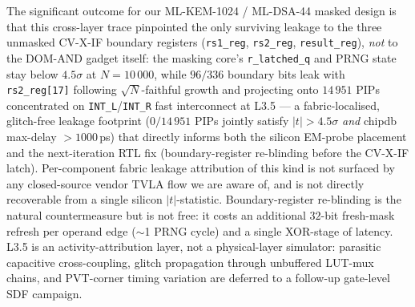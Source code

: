 \documentclass[10pt,a4paper]{article}
\begin{document}
The significant outcome for our ML-KEM-1024 / ML-DSA-44 masked design is
that this cross-layer trace pinpointed the only surviving leakage to the
three unmasked CV-X-IF boundary registers (\texttt{rs1\_reg},
\texttt{rs2\_reg}, \texttt{result\_reg}), \emph{not} to the DOM-AND gadget
itself: the masking core's \texttt{r\_latched\_q} and PRNG state stay below
$4.5\sigma$ at $N{=}10\,000$, while $96/336$ boundary bits leak with
\texttt{rs2\_reg[17]} following $\sqrt{N}$-faithful growth and projecting
onto $14\,951$ PIPs concentrated on \texttt{INT\_L}/\texttt{INT\_R} fast
interconnect at L3.5 --- a fabric-localised, glitch-free leakage footprint
($0/14\,951$ PIPs jointly satisfy $|t|>4.5\sigma$ \emph{and} chipdb
max-delay $>1000$\,ps) that directly informs both the silicon EM-probe
placement and the next-iteration RTL fix (boundary-register re-blinding
before the CV-X-IF latch).  Per-component fabric leakage attribution of
this kind is not surfaced by any closed-source vendor TVLA flow we are
aware of, and is not directly recoverable from a single silicon
$|t|$-statistic.  Boundary-register re-blinding is the natural
countermeasure but is not free: it costs an additional $32$-bit fresh-mask
refresh per operand edge ($\sim$1 PRNG cycle) and a single XOR-stage of
latency.  L3.5 is an activity-attribution layer, not a physical-layer
simulator: parasitic capacitive cross-coupling, glitch propagation through
unbuffered LUT-mux chains, and PVT-corner timing variation are deferred to
a follow-up gate-level SDF campaign.
\end{document}
